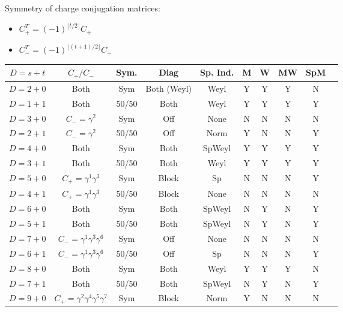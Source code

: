 \documentclass[11pt]{article}
\begin{document}


Symmetry of charge conjugation matrices:
\begin{itemize}
    \item $C_+^T = (-1)^{\lfloor t/2 \rfloor} C_+$
    \item $C_-^T = (-1)^{\lfloor (t + 1)/2 \rfloor} C_-$
\end{itemize}


\begin{table}[H]
    \centering
    \begin{tabular}{|c|c|c|c|c|c|c|c|c|c|}
        \hline
        $D = s + t$ & $C_+/C_-$ & Sym. & Diag & Sp. Ind. & M & W & MW & SpM\\
        \hline
        $D = 2 + 0$ & Both & Sym & Both (Weyl) & Weyl & Y & Y & Y & N\\
        $D = 1 + 1$ & Both & 50/50 & Both & Weyl & Y & Y & Y & Y\\
        $D = 3 + 0$ & $C_- = \gamma^2$ & Sym & Off & None & N & N & N & N\\
        $D = 2 + 1$ & $C_- = \gamma^2$ & 50/50 & Off & Norm & Y & N & N & Y\\
        $D = 4 + 0$ & Both & Sym & Both & SpWeyl & Y & Y & Y & Y\\
        $D = 3 + 1$ & Both & 50/50 & Both & Weyl & Y & Y & Y & Y\\
        $D = 5 + 0$ & $C_+ = \gamma^1 \gamma^3$ & Sym & Block & Sp & N & N & N & Y\\
        $D = 4 + 1$ & $C_+ = \gamma^1 \gamma^3$ & 50/50 & Block & None & N & N & N & N\\
        $D = 6 + 0$ & Both & Sym & Both & SpWeyl & N & Y & N & Y\\
        $D = 5 + 1$ & Both & 50/50 & Both & SpWeyl & N & Y & N & Y\\
        $D = 7 + 0$ & $C_- = \gamma^1 \gamma^3 \gamma^6$ & Sym & Off & None & N & N & N & N\\
        $D = 6 + 1$ & $C_- = \gamma^1 \gamma^3 \gamma^6$ & 50/50 & Off & Sp & N & N & N & Y\\
        $D = 8 + 0$ & Both & Sym & Both & Weyl & Y & Y & Y & N\\
        $D = 7 + 1$ & Both & 50/50 & Both & SpWeyl & N & Y & N & Y\\
        $D = 9 + 0$ & $C_+ = \gamma^2 \gamma^4 \gamma^5 \gamma^7$ & Sym & Block & Norm & Y & N & N & N\\

\end{tabular}
\end{table}
\end{document}
